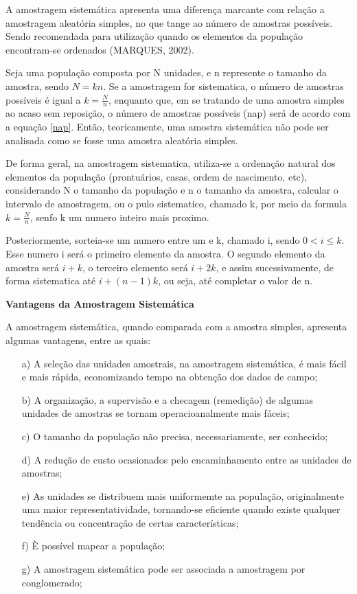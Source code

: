 A amostragem sistemática apresenta uma diferença marcante com relação a amostragem aleatória simples, no que tange
ao número de amostras possíveis. Sendo recomendada para utilização quando os elementos da população encontram-se
ordenados (MARQUES, 2002).\vskip0.3cm


\newpage
Seja uma população composta por N unidades, e n represente o tamanho da amostra, sendo $N=kn$. Se a amostragem for sistematica, o número de amostras possíveis é igual a $k=\frac{N}{n}$, enquanto que, em se tratando de uma amostra simples ao acaso sem reposição, o número de amostras possíveis (nap) será de acordo com a equação \ref{nap}. Então, teoricamente, uma amostra sistemática não pode ser analisada como se fosse uma amostra aleatória simples. \vskip0.3cm



De forma geral, na amostragem sistematica, utiliza-se a ordenação
natural dos elementos da população (prontuários, casas, ordem de
nascimento, etc), considerando N o tamanho da população e n o
tamanho da amostra, calcular o intervalo de amostragem, ou o pulo
sistematico, chamado k, por meio da formula $k=\frac{N}{n}$, senfo
k um numero inteiro mais proximo.\vskip0.3cm

Posteriormente, sorteia-se um numero entre um e k, chamado i,
sendo $0 < i \leq k$. Esse numero i será o primeiro elemento da
amostra. O segundo elemento da amostra será $i+k$, o terceiro
elemento será $i+2k$, e assim sucessivamente, de forma sistematica
até $i+(n-1)k$, ou seja, até completar o valor de n.

\vskip0.3cm


\textbf{Vantagens da Amostragem Sistemática}
\vskip0.3cm

A amostragem sistemática, quando comparada com a amostra simples, apresenta algumas vantagens, entre as quais:



\begin{enumerate}
  \item[{a)}] A seleção das unidades amostrais, na amostragem sistemática, é mais fácil e mais rápida, economizando tempo na obtenção dos dados de campo;
  \item[{b)}] A organização, a supervisão e a checagem (remedição) de algumas unidades de amostras se tornam operacioanalmente mais fáceis;
  \item[{c)}] O tamanho da população não precisa, necessariamente, ser conhecido;
  \item[{d)}] A redução de custo ocasionados pelo encaminhamento entre as unidades de amostras;
  \item[{e)}] As unidades se distribuem mais uniformemte na população, originalmente uma maior representatividade, tornando-se eficiente quando existe qualquer tendência ou concentração de certas características;
  \item[{f)}] È possível mapear a população;
  \item[{g)}] A amostragem sistemática pode ser associada  a amostragem por conglomerado;
\end{enumerate}

